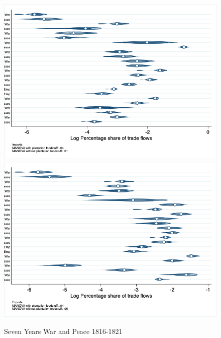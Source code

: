 \documentclass[12pt,a4paper,notitlepage,english]{article}
\begin{document}
\begin{figure}
\centering
\caption{Seven Years War and Peace 1816-1821}
\label{seven_peace1764_1777_nat_distr}
\includegraphics[scale=.4]{seven_peace1764_1777_nat_distr_Ipays}
\includegraphics[scale=.4]{seven_peace1764_1777_nat_distr_Xpays}
\end{figure}
\end{document}
